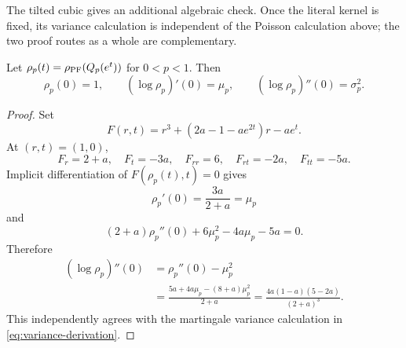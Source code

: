 The tilted cubic gives an additional algebraic check.  Once the literal
kernel is fixed, its variance calculation is independent of the Poisson
calculation above; the two proof routes as a whole are complementary.

\begin{proposition}
\label{prop:perron-derivatives}
Let $\rho_p(t)=\rho_{\mathrm{PF}}(Q_p(e^t))$ for $0<p<1$.  Then
\[
 \rho_p(0)=1,\qquad
 (\log\rho_p)'(0)=\mu_p,\qquad
 (\log\rho_p)''(0)=\sigma_p^2.
\]
\end{proposition}

\begin{proof}
Set
\[
 F(r,t)=r^3+(2a-1-ae^{2t})r-ae^t.
\]
At $(r,t)=(1,0)$,
\[
 F_r=2+a,\quad F_t=-3a,\quad
 F_{rr}=6,\quad F_{rt}=-2a,\quad F_{tt}=-5a.
\]
Implicit differentiation of $F(\rho_p(t),t)=0$ gives
\[
 \rho_p'(0)=\frac{3a}{2+a}=\mu_p
\]
and
\[
 (2+a)\rho_p''(0)+6\mu_p^2-4a\mu_p-5a=0.
\]
Therefore
\begin{align*}
 (\log\rho_p)''(0)
 &=\rho_p''(0)-\mu_p^2\\
 &=\frac{5a+4a\mu_p-(8+a)\mu_p^2}{2+a}
 =\frac{4a(1-a)(5-2a)}{(2+a)^3}.
\end{align*}
This independently agrees with the martingale variance calculation in
\eqref{eq:variance-derivation}.
\end{proof}
